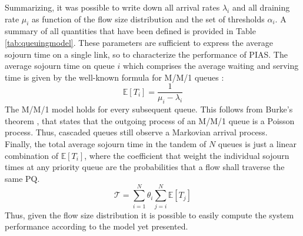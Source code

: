 \begin{table}%
	\footnotesize 
	\centering
	\caption{Variables of the model.}
		\label{tab:queuingmodel}
\end{table}

Summarizing, it was possible to write down all arrival rates $\lambda_{i}$ and all draining rate $\mu_i$ as function of the flow size distribution and the set of thresholds $\alpha_i$. A summary of all quantities that have been defined is provided in Table \ref{tab:queuingmodel}.
These parameters are sufficient to express the average sojourn time on a single link, so to characterize the performance of PIAS. The average sojourn time on queue $i$ which comprises the average waiting and serving time is given by the well-known formula for M/M/1 queues \cite{klein-queuing-theory}:
\begin{equation}
\label{mm1}
\mathbb{E}[T_i] = \dfrac{1}{\mu_i-\lambda_i}
\end{equation}
The M/M/1 model holds for every subsequent queue. This follows from Burke's theorem \cite{burke}, that states that the outgoing process of an M/M/1 queue is a Poisson process. Thus, cascaded queues still observe a Markovian arrival process. \\
Finally, the total average sojourn time in the tandem of $N$ queues is just a linear combination of $\mathbb{E}[T_i]$, where the coefficient that weight the individual sojourn times at any priority queue are the probabilities that a flow shall traverse the same PQ.
\begin{equation}
\mathcal{T} = 
\sum_{i=1}^{N} \theta_i \sum_{j=i}^{N}\mathbb{E}[T_j]
\end{equation}
Thus, given the flow size distribution it is possible to easily compute the system performance according to the model yet presented. 

